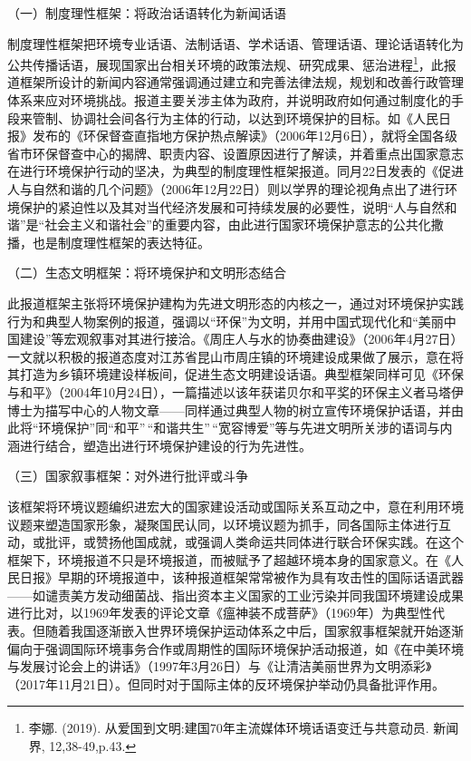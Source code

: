 （一）制度理性框架：将政治话语转化为新闻话语

制度理性框架把环境专业话语、法制话语、学术话语、管理话语、理论话语转化为公共传播话语，展现国家出台相关环境的政策法规、研究成果、惩治进程\footnote{李娜.
  (2019). 从爱国到文明:建国70年主流媒体环境话语变迁与共意动员. 新闻界,
  12,38-49,p.43.}，此报道框架所设计的新闻内容通常强调通过建立和完善法律法规，规划和改善行政管理体系来应对环境挑战。报道主要关涉主体为政府，并说明政府如何通过制度化的手段来管制、协调社会间各行为主体的行动，以达到环境保护的目标。如《人民日报》发布的《环保督查直指地方保护热点解读》（2006年12月6日），就将全国各级省市环保督查中心的揭牌、职责内容、设置原因进行了解读，并着重点出国家意志在进行环境保护行动的坚决，为典型的制度理性框架报道。同月22日发表的《促进人与自然和谐的几个问题》（2006年12月22日）则以学界的理论视角点出了进行环境保护的紧迫性以及其对当代经济发展和可持续发展的必要性，说明``人与自然和谐''是``社会主义和谐社会''的重要内容，由此进行国家环境保护意志的公共化撒播，也是制度理性框架的表达特征。

（二）生态文明框架：将环境保护和文明形态结合

此报道框架主张将环境保护建构为先进文明形态的内核之一，通过对环境保护实践行为和典型人物案例的报道，强调以``环保''为文明，并用中国式现代化和``美丽中国建设''等宏观叙事对其进行接洽。《周庄人与水的协奏曲建设》（2006年4月27日）一文就以积极的报道态度对江苏省昆山市周庄镇的环境建设成果做了展示，意在将其打造为乡镇环境建设样板间，促进生态文明建设话语。典型框架同样可见《环保与和平》（2004年10月24日），一篇描述以该年获诺贝尔和平奖的环保主义者马塔伊博士为描写中心的人物文章------同样通过典型人物的树立宣传环境保护话语，并由此将``环境保护''同``和平''\,``和谐共生''\,``宽容博爱''等与先进文明所关涉的语词与内涵进行结合，塑造出进行环境保护建设的行为先进性。

（三）国家叙事框架：对外进行批评或斗争

该框架将环境议题编织进宏大的国家建设活动或国际关系互动之中，意在利用环境议题来塑造国家形象，凝聚国民认同，以环境议题为抓手，同各国际主体进行互动，或批评，或赞扬他国成就，或强调人类命运共同体进行联合环保实践。在这个框架下，环境报道不只是环境报道，而被赋予了超越环境本身的国家意义。在《人民日报》早期的环境报道中，该种报道框架常常被作为具有攻击性的国际话语武器------如谴责美方发动细菌战、指出资本主义国家的工业污染并同我国环境建设成果进行比对，以1969年发表的评论文章《瘟神装不成菩萨》（1969年）为典型性代表。但随着我国逐渐嵌入世界环境保护运动体系之中后，国家叙事框架就开始逐渐偏向于强调国际环境事务合作或周期性的国际环境保护活动报道，如《在中美环境与发展讨论会上的讲话》（1997年3月26日）与《让清洁美丽世界为文明添彩》（2017年11月21日）。但同时对于国际主体的反环境保护举动仍具备批评作用。

